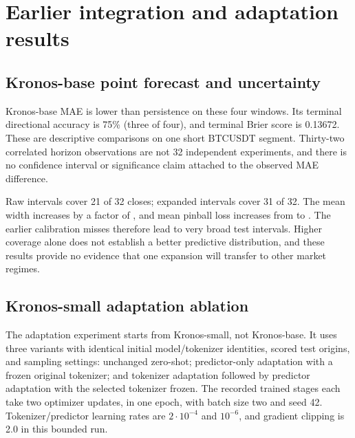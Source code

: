 \documentclass[11pt,a4paper]{article}
\begin{document}

\clearpage
\section{Earlier integration and adaptation results}
\subsection{Kronos-base point forecast and uncertainty}
\begin{table}[htbp]
\centering\small

\caption{Kronos-base test point metrics against matching persistence.
MAE/RMSE are USDT; return MAE is percentage points; direction is percent;
Brier is unitless. Expansion leaves these model quantities unchanged.}
\label{tab:point}
\end{table}
Kronos-base MAE is \MAEReductionPercent{} lower than persistence on these
four windows. Its terminal directional accuracy is 75\% (three of four), and
terminal Brier score is 0.13672. These are descriptive comparisons on one short
BTCUSDT segment. Thirty-two correlated horizon observations are not 32
independent experiments, and there is no confidence interval or significance
claim attached to the observed MAE difference.

\begin{table}[htbp]
\centering\small

\caption{Kronos-base q10--q90 test intervals. Coverage is percent; width and
mean pinball loss are in USDT. The label ``80\%'' denotes quantile levels,
not verified future coverage.}
\label{tab:interval}
\end{table}
Raw intervals cover 21 of 32 closes; expanded intervals cover 31 of 32. The
mean width increases by a factor of \WidthRatio{}, and mean pinball loss
increases from \RawPinball{} to \CalPinball{}. The earlier calibration misses
therefore lead to very broad test intervals. Higher coverage alone does not
establish a better predictive distribution, and these results provide no
evidence that one expansion will transfer to other market regimes.

\subsection{Kronos-small adaptation ablation}
The adaptation experiment starts from Kronos-small, not Kronos-base. It uses
three variants with identical initial model/tokenizer identities, scored test
origins, and sampling settings: unchanged zero-shot; predictor-only adaptation
with a frozen original tokenizer; and tokenizer adaptation followed by predictor
adaptation with the selected tokenizer frozen. The recorded trained stages each
take two optimizer updates, in one epoch, with batch size two and seed 42.
Tokenizer/predictor learning rates are $2\cdot10^{-4}$ and $10^{-6}$, and
gradient clipping is 2.0 in this bounded run.
\end{document}
